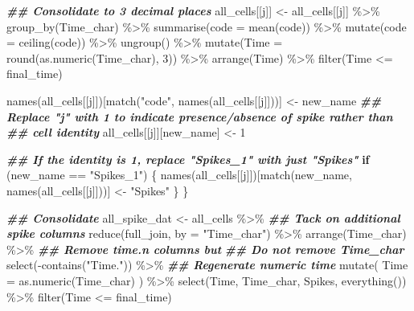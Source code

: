 \documentclass[
]{book}
\newenvironment{Shaded}{\begin{snugshade}}{\end{snugshade}}
\newcommand{\AttributeTok}[1]{\textcolor[rgb]{0.77,0.63,0.00}{#1}}
\newcommand{\ControlFlowTok}[1]{\textcolor[rgb]{0.13,0.29,0.53}{\textbf{#1}}}
\newcommand{\DecValTok}[1]{\textcolor[rgb]{0.00,0.00,0.81}{#1}}
\newcommand{\DocumentationTok}[1]{\textcolor[rgb]{0.56,0.35,0.01}{\textbf{\textit{#1}}}}
\newcommand{\FunctionTok}[1]{\textcolor[rgb]{0.00,0.00,0.00}{#1}}
\newcommand{\NormalTok}[1]{#1}
\newcommand{\OtherTok}[1]{\textcolor[rgb]{0.56,0.35,0.01}{#1}}
\newcommand{\SpecialCharTok}[1]{\textcolor[rgb]{0.00,0.00,0.00}{#1}}
\newcommand{\StringTok}[1]{\textcolor[rgb]{0.31,0.60,0.02}{#1}}
\begin{document}
\begin{Shaded}
\begin{Highlighting}[]
      \DocumentationTok{\#\# Consolidate to 3 decimal places}
\NormalTok{      all\_cells[[j]] }\OtherTok{\textless{}{-}}
\NormalTok{        all\_cells[[j]] }\SpecialCharTok{\%\textgreater{}\%}
        \FunctionTok{group\_by}\NormalTok{(Time\_char) }\SpecialCharTok{\%\textgreater{}\%}
        \FunctionTok{summarise}\NormalTok{(}\AttributeTok{code =} \FunctionTok{mean}\NormalTok{(code)) }\SpecialCharTok{\%\textgreater{}\%}
        \FunctionTok{mutate}\NormalTok{(}\AttributeTok{code =} \FunctionTok{ceiling}\NormalTok{(code)) }\SpecialCharTok{\%\textgreater{}\%}
        \FunctionTok{ungroup}\NormalTok{() }\SpecialCharTok{\%\textgreater{}\%}
        \FunctionTok{mutate}\NormalTok{(}\AttributeTok{Time =} \FunctionTok{round}\NormalTok{(}\FunctionTok{as.numeric}\NormalTok{(Time\_char), }\DecValTok{3}\NormalTok{)) }\SpecialCharTok{\%\textgreater{}\%}
        \FunctionTok{arrange}\NormalTok{(Time) }\SpecialCharTok{\%\textgreater{}\%}
        \FunctionTok{filter}\NormalTok{(Time }\SpecialCharTok{\textless{}=}\NormalTok{ final\_time)}

      \FunctionTok{names}\NormalTok{(all\_cells[[j]])[}\FunctionTok{match}\NormalTok{(}\StringTok{"code"}\NormalTok{, }\FunctionTok{names}\NormalTok{(all\_cells[[j]]))] }\OtherTok{\textless{}{-}}
\NormalTok{        new\_name}
      \DocumentationTok{\#\# Replace "j" with 1 to indicate presence/absence of spike rather than}
      \DocumentationTok{\#\# cell identity}
\NormalTok{      all\_cells[[j]][new\_name] }\OtherTok{\textless{}{-}} \DecValTok{1}

      \DocumentationTok{\#\# If the identity is 1, replace "Spikes\_1" with just "Spikes"}
      \ControlFlowTok{if}\NormalTok{ (new\_name }\SpecialCharTok{==} \StringTok{"Spikes\_1"}\NormalTok{) \{}
        \FunctionTok{names}\NormalTok{(all\_cells[[j]])[}\FunctionTok{match}\NormalTok{(new\_name, }\FunctionTok{names}\NormalTok{(all\_cells[[j]]))] }\OtherTok{\textless{}{-}}
          \StringTok{"Spikes"}
\NormalTok{      \}}
\NormalTok{    \}}

    \DocumentationTok{\#\# Consolidate}
\NormalTok{    all\_spike\_dat }\OtherTok{\textless{}{-}}
\NormalTok{      all\_cells }\SpecialCharTok{\%\textgreater{}\%}
      \DocumentationTok{\#\# Tack on additional spike columns}
      \FunctionTok{reduce}\NormalTok{(full\_join, }\AttributeTok{by =} \StringTok{"Time\_char"}\NormalTok{) }\SpecialCharTok{\%\textgreater{}\%}
      \FunctionTok{arrange}\NormalTok{(Time\_char) }\SpecialCharTok{\%\textgreater{}\%}
      \DocumentationTok{\#\# Remove time.n columns but}
      \DocumentationTok{\#\# Do not remove Time\_char}
      \FunctionTok{select}\NormalTok{(}\SpecialCharTok{{-}}\FunctionTok{contains}\NormalTok{(}\StringTok{"Time."}\NormalTok{)) }\SpecialCharTok{\%\textgreater{}\%}
      \DocumentationTok{\#\# Regenerate numeric time}
      \FunctionTok{mutate}\NormalTok{(}
        \AttributeTok{Time =} \FunctionTok{as.numeric}\NormalTok{(Time\_char)}
\NormalTok{      ) }\SpecialCharTok{\%\textgreater{}\%}
      \FunctionTok{select}\NormalTok{(Time, Time\_char, Spikes, }\FunctionTok{everything}\NormalTok{()) }\SpecialCharTok{\%\textgreater{}\%}
      \FunctionTok{filter}\NormalTok{(Time }\SpecialCharTok{\textless{}=}\NormalTok{ final\_time)}


\end{Highlighting}
\end{Shaded}
\end{document}
